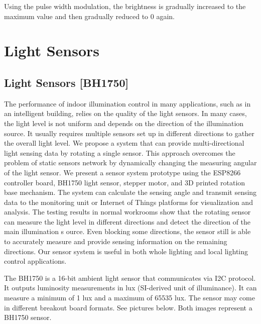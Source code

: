 Using the pulse width modulation, the brightness is gradually increased to the maximum value and then gradually reduced to 0 again.




{
	\label{Nano:PowerLEDTestPWM}
}

\section{Light Sensors}
\subsection{Light Sensors [BH1750]}

The performance of indoor illumination control in many applications, such as in an intelligent building, relies on the quality of the light sensors. In many cases, the light level is not uniform and depends on the direction of the illumination source. It usually requires multiple sensors set up in different directions to gather the overall light level. We propose a system that can provide multi-directional light sensing data by rotating a single sensor. This approach overcomes the problem of static sensors network by dynamically changing the measuring angular of the light sensor. We present a sensor system prototype using the ESP8266 controller board, BH1750 light sensor, stepper motor, and 3D printed rotation base mechanism. The system can calculate the sensing angle and transmit sensing data to the monitoring unit or Internet of Things platforms for visualization and analysis. The testing results in normal workrooms show that the  rotating sensor can measure the light level in different directions and detect the direction of the main illumination s  ource. Even blocking some directions, the sensor still is able to accurately measure and provide sensing information on the remaining directions. Our sensor system is useful in both whole lighting and local lighting control applications.

The BH1750 is a 16-bit ambient light sensor that communicates via I2C protocol. It outputs luminosity measurements in lux (SI-derived unit of illuminance). It can measure a minimum of 1 lux and a maximum of 65535 lux. The sensor may come in different breakout board formats. See pictures below. Both images represent a BH1750 sensor.

